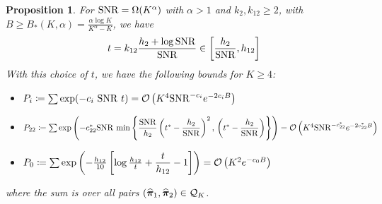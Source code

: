 \documentclass[numsec,webpdf,modern,medium,namedate]{oup-authoring-template}
\theoremstyle{thmstyleone}%
\newtheorem{proposition}{Proposition}
\theoremstyle{thmstyletwo}%
\theoremstyle{thmstylethree}%
\begin{document}
\begin{proposition}\label{prop:choice-t}
    For $\mathrm{SNR} = \Omega(K^\alpha)$ with $\alpha >1$ and $k_2,k_{12} \geq 2$, with $B \geq B_\ast(K,\alpha) = \frac{\alpha\log K}{K^\alpha - K}$, we have
    $$
    t = k_{12}\dfrac{h_2 + \log \mathrm{SNR}}{\mathrm{SNR}} \in \left[\dfrac{h_2}{\mathrm{SNR}},h_{12}\right]
    $$
    With this choice of $t$, we have the following bounds for $K \geq 4$:
    {\footnotesize
    \begin{itemize}
        \item $ P_i \coloneq \sum \exp(-c_i \ \mathrm{SNR} \ t) = \mathcal{O}\left(K^4 \mathrm{SNR} ^{-c_i}e^{-2c_iB}\right)$
        \item $ P_{22} \coloneq \sum\exp \left( - c^\ast_{22} \mathrm{SNR} \, \min \left\{\dfrac{\mathrm{SNR}}{h_2}\left(t^\ast - \dfrac{h_2}{\mathrm{SNR}}\right)^2, \, \left(t^\ast - \dfrac{h_2}{\mathrm{SNR}}\right) \right\}\right) = \mathcal{O}\left(K^4 \mathrm{SNR} ^{-c^\ast_{22}}e^{-2c^\ast_{22}B}\right)$
        \item $P_0 \coloneq \sum\exp\left(-\frac{h_{12}}{10}\left[\log \frac{h_{12}}{t} + \dfrac{t}{h_{12}} -1\right]\right) = \mathcal{O}\left(K^2 e^{-c_0 B}\right)$
    \end{itemize}}
    \noindent 
    where the sum is over all pairs $(\widehat{\boldsymbol{\pi}}_1, \widehat{\boldsymbol{\pi}}_2 ) \in \mathcal{Q}_K$.
\end{proposition}
\end{document}
